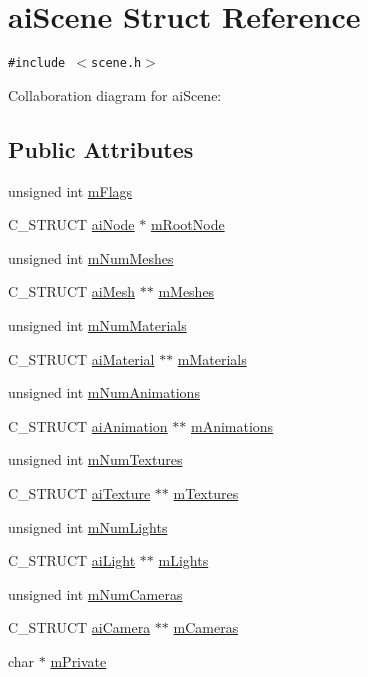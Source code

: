 \hypertarget{structai_scene}{
\section{aiScene Struct Reference}
\label{structai_scene}
}
{\tt \#include $<$scene.h$>$}

Collaboration diagram for aiScene:\subsection*{Public Attributes}
\begin{CompactItemize}
\item 
unsigned int \hyperlink{structai_scene_4091f10bb81e05db00ebc34f40c48f38}{mFlags}
\item 
C\_\-STRUCT \hyperlink{structai_node}{aiNode} $\ast$ \hyperlink{structai_scene_d0e9a7e68f2ed6b3120a7c19ef20307a}{mRootNode}
\item 
unsigned int \hyperlink{structai_scene_1a6c1abca994c54381a28cc151e5fa4f}{mNumMeshes}
\item 
C\_\-STRUCT \hyperlink{structai_mesh}{aiMesh} $\ast$$\ast$ \hyperlink{structai_scene_d1c7000f0f28ea747868db9f94d32a3d}{mMeshes}
\item 
unsigned int \hyperlink{structai_scene_4277d8bffe8b8f568098af6c31d042b7}{mNumMaterials}
\item 
C\_\-STRUCT \hyperlink{structai_material}{aiMaterial} $\ast$$\ast$ \hyperlink{structai_scene_52bc7089a5b943ad7c7c386e616df35e}{mMaterials}
\item 
unsigned int \hyperlink{structai_scene_a2af030ec218ead0dc062b6a96a7471a}{mNumAnimations}
\item 
C\_\-STRUCT \hyperlink{structai_animation}{aiAnimation} $\ast$$\ast$ \hyperlink{structai_scene_b76fb8f38c2e7365ccce42d565b62b25}{mAnimations}
\item 
unsigned int \hyperlink{structai_scene_0d61a5439edd7223097b48aea57c47dd}{mNumTextures}
\item 
C\_\-STRUCT \hyperlink{structai_texture}{aiTexture} $\ast$$\ast$ \hyperlink{structai_scene_0fd0d29fbc439e3715b4975ccb68d2d3}{mTextures}
\item 
unsigned int \hyperlink{structai_scene_0c90fc5f15b979e0bb0d3e8f1e246307}{mNumLights}
\item 
C\_\-STRUCT \hyperlink{structai_light}{aiLight} $\ast$$\ast$ \hyperlink{structai_scene_2e64a69ade81cae0b3901bea90b6bb47}{mLights}
\item 
unsigned int \hyperlink{structai_scene_4abc432e1b22a7e01553f33c79c0592f}{mNumCameras}
\item 
C\_\-STRUCT \hyperlink{structai_camera}{aiCamera} $\ast$$\ast$ \hyperlink{structai_scene_71e7d204d96969ca4f5a931f4d636f1e}{mCameras}
\item 
char $\ast$ \hyperlink{structai_scene_dc5fcf5c4ef86a45f721560d6c1a4923}{mPrivate}
\end{CompactItemize}


